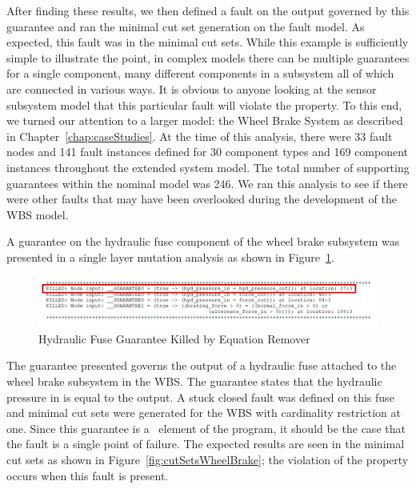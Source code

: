 After finding these results, we then defined a fault on the output governed by this guarantee and ran the minimal cut set generation on the fault model. As expected, this fault was in the minimal cut sets. While this example is sufficiently simple to illustrate the point, in complex models there can be multiple guarantees for a single component, many different components in a subsystem all of which are connected in various ways. It is obvious to anyone looking at the sensor subsystem model that this particular fault will violate the property. To this end, we turned our attention to a larger model: the Wheel Brake System as described in Chapter~\ref{chap:caseStudies}. At the time of this analysis, there were 33 fault nodes and 141 fault instances defined for 30 component types and 169 component instances throughout the extended system model. The total number of supporting guarantees within the nominal model was 246. We ran this analysis to see if there were other faults that may have been overlooked during the development of the WBS model. 

A guarantee on the hydraulic fuse component of the wheel brake subsystem was presented in a single layer mutation analysis as shown in Figure~\ref{fig:wheelBrakeGuaranteeKilled}. 

\begin{figure}[h]
	\begin{center}
		\includegraphics[scale=0.8]{images/wheelBrakeGuaranteesKilled.PNG}
	\end{center}
	\caption{Hydraulic Fuse Guarantee Killed by Equation Remover}
	\label{fig:wheelBrakeGuaranteeKilled}
\end{figure}

The guarantee presented governs the output of a hydraulic fuse attached to the wheel brake subsystem in the WBS. The guarantee states that the hydraulic pressure in is equal to the output. A stuck closed fault was defined on this fuse and minimal cut sets were generated for the WBS with cardinality restriction at one. Since this guarantee is a \mustcov\ element of the program, it should be the case that the fault is a single point of failure. The expected results are seen in the minimal cut sets as shown in Figure~\ref{fig:cutSetsWheelBrake}; the violation of the property occurs when this fault is present. 

